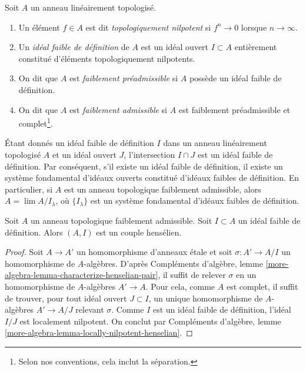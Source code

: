 \begin{definition}
\label{definition-weakly-admissible}
Soit $A$ un anneau linéairement topologisé.
\begin{enumerate}
\item Un élément $f \in A$ est dit {\it topologiquement nilpotent}
si $f^n \to 0$ lorsque $n \to \infty$.
\item Un {\it idéal faible de définition} de $A$ est un idéal ouvert
$I \subset A$ entièrement constitué d'éléments topologiquement nilpotents.
\item On dit que $A$ est {\it faiblement préadmissible} si $A$ possède un idéal faible
de définition.
\item On dit que $A$ est {\it faiblement admissible} si $A$ est faiblement préadmissible
et complet\footnote{Selon nos conventions, cela inclut la séparation.}.
\end{enumerate}
\end{definition}

\noindent
Étant donnés un idéal faible de définition $I$ dans un anneau linéairement topologisé
$A$ et un idéal ouvert $J$, l'intersection $I \cap J$ est un
idéal faible de définition. Par conséquent, s'il existe un idéal faible de définition,
il existe un système fondamental d'idéaux ouverts
constitué d'idéaux faibles de définition. En particulier,
si $A$ est un anneau topologique faiblement admissible, alors
$A = \lim A/I_\lambda$, où $\{I_\lambda\}$ est un système fondamental
d'idéaux faibles de définition.

\begin{lemma}
\label{lemma-weakly-admissible-henselian}
Soit $A$ un anneau topologique faiblement admissible. Soit $I \subset A$
un idéal faible de définition. Alors $(A, I)$ est un couple hensélien.
\end{lemma}

\begin{proof}
Soit $A \to A'$ un homomorphisme d'anneaux étale et soit $\sigma : A' \to A/I$
un homomorphisme de $A$-algèbres. D'après Compléments d'algèbre, lemme
\ref{more-algebra-lemma-characterize-henselian-pair}, il suffit
de relever $\sigma$ en un homomorphisme de $A$-algèbres $A' \to A$.
Pour cela, comme $A$ est complet, il suffit de trouver,
pour tout idéal ouvert $J \subset I$, un unique homomorphisme de $A$-algèbres $A' \to A/J$
relevant $\sigma$. Comme $I$ est un idéal faible de définition,
l'idéal $I/J$ est localement nilpotent. On conclut par
Compléments d'algèbre, lemme \ref{more-algebra-lemma-locally-nilpotent-henselian}.
\end{proof}

